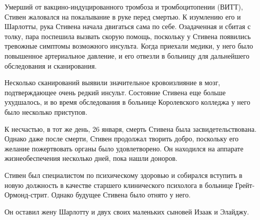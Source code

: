 Умерший от вакцино-индуцированного тромбоза и тромбоцитопении (ВИТТ), Стивен
жаловался на покалывание в руке перед смертью. К изумлению его и Шарлотты, рука
Стивена начала двигаться сама по себе. Озадаченная и сбитая с толку, пара
поспешила вызвать скорую помощь, поскольку у Стивена появились тревожные
симптомы возможного инсульта. Когда приехали медики, у него было повышенное
артериальное давление, и его отвезли в больницу для дальнейшего обследования и
сканирования.

Несколько сканирований выявили значительное кровоизлияние в мозг, подтверждающее
очень редкий инсульт. Состояние Стивена еще больше ухудшалось, и во время
обследования в больнице Королевского колледжа у него было несколько приступов.

К несчастью, в тот же день, 26 января, смерть Стивена была
засвидетельствована. Однако даже после смерти, Стивен продолжал творить добро,
поскольку его желание пожертвовать органы было удовлетворено. Он находился на
аппарате жизнеобеспечения несколько дней, пока нашли доноров.

Стивен был специалистом по психическому здоровью и собирался вступить в новую
должность в качестве старшего клинического психолога в больнице
Грейт-Ормонд-стрит. Однако будущее Стивена было отнято у него.

Он оставил жену Шарлотту и двух своих маленьких сыновей Изаак и Элайджу.
